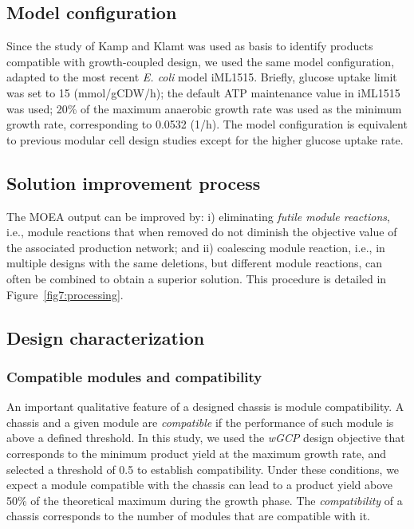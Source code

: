 {\subsection{Model configuration}
Since the study of Kamp and Klamt\citep{kamp2017} was used as basis to identify products compatible with growth-coupled design, we used the same model configuration, adapted to the most recent \textit{E. coli} model iML1515.\citep{monk2017} Briefly, glucose uptake limit was set to 15 (mmol/gCDW/h); the default ATP maintenance value in iML1515 was used; 20\% of the maximum anaerobic growth rate was used as the minimum growth rate, corresponding to 0.0532 (1/h). The model configuration is equivalent to previous modular cell design studies\citep{garcia2019} except for the higher glucose uptake rate.


\subsection{Solution improvement process}
The MOEA output can be improved by: i) eliminating \emph{futile module reactions}, i.e., module reactions that when removed do not diminish the objective value of the associated production network; and ii) coalescing module reaction, i.e., in multiple designs with the same deletions, but different module reactions, can often be combined to obtain a superior solution. This procedure is detailed in Figure~\ref{fig7:processing}.

\subsection{Design characterization} \label{sec:design_characterization}
\subsubsection{Compatible modules and compatibility}
An important qualitative feature of a designed chassis is module compatibility.
A chassis and a given module are \emph{compatible} if the performance of such module is above a defined threshold.
In this study, we used the \textit{wGCP} design objective that corresponds to the minimum product yield at the maximum growth rate, and selected a threshold of 0.5 to establish compatibility. Under these conditions, we expect a module compatible with the chassis can lead to a product yield above 50\% of the theoretical maximum during the growth phase.
The \emph{compatibility} of a chassis corresponds to the number of modules that are compatible with it.

}
